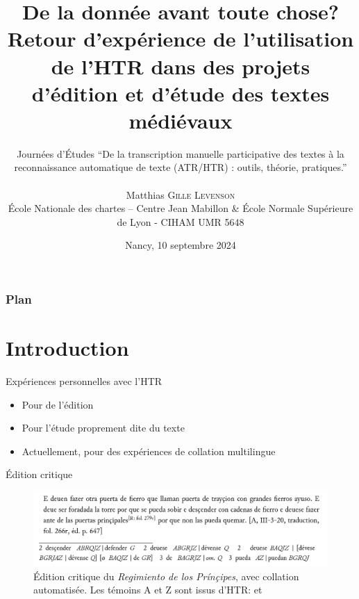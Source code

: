 \documentclass[11pt,aspectratio=169]{beamer}
\date[10/09/2024]{Nancy, 10 septembre 2024}
\author[Matthias \textsc{Gille Levenson}]{Journées d'Études \enquote{De la transcription manuelle participative des textes à la reconnaissance automatique de texte (ATR/HTR) : outils, théorie, pratiques.}\\~\\ Matthias \textsc{Gille Levenson}\\   {\scriptsize École Nationale des chartes -- Centre Jean Mabillon \& École Normale Supérieure de Lyon - CIHAM UMR 5648}\vspace{-.5cm}%
}
\title[De la donnée avant toute chose?]{De la donnée avant toute chose? Retour d'expérience de l'utilisation de l'HTR dans des projets d'édition et d'étude des textes médiévaux}
\let\cite\parencite
\begin{document}
\maketitle





\begin{frame}
\frametitle{Plan} %
\tableofcontents %
\end{frame}


\section{Introduction}
\begin{frame}{Expériences personnelles avec l'HTR}

\begin{itemize}
\item Pour de l'édition
\item Pour l'étude proprement dite du texte
\item Actuellement, pour des expériences de collation multilingue
\end{itemize}

\end{frame}

\begin{frame}{Édition critique}
\begin{figure}
\includegraphics[width=1\textwidth]{img/base_a.png}
\caption{Édition critique du \textit{Regimiento de los Prínçipes}, avec collation automatisée. Les témoins A et Z sont issus d'HTR: \cite{gillelevenson_RegimientoPrincipesSa_2023} et \cite{gillelevenson_GeneralOpenDataset_2023}}
\end{figure}
\end{frame}
\end{document}
